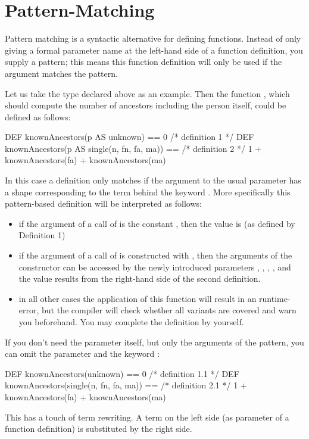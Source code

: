 \section{Pattern-Matching}
\label{sec:patternType}

\advanced 
Pattern matching is a syntactic alternative for defining functions.
Instead of only giving a formal parameter name at the left-hand side of a
function definition, 
you supply a pattern; this means this function definition will only
be used if the argument matches the pattern.

Let us take the  type   declared above as an example.
Then the
function , which should compute the
number of ancestors including the person itself, could be defined as
follows:
\begin{prog}
DEF knownAncestors(p AS unknown) == 0                /* definition 1 */
DEF knownAncestors(p AS single(n, fn, fa, ma)) ==    /* definition 2 */
              1 + knownAncestors(fa) + knownAncestors(ma)
\end{prog}
In this case a definition only matches if the argument to the usual
parameter  has 
a shape corresponding to the term behind the keyword .
More specifically this pattern-based definition will be interpreted as
follows: 
\begin{itemize}
\item if the argument of a call of  is the
  constant , then the value is  (as defined by
  Definition 1)
\item if the argument of a call of  is constructed
  with , then the arguments of the constructor can be
  accessed by the newly introduced parameters , ,
  , , and the value 
  results from the right-hand side of the second definition.
\item in all other cases the application of this function will result
  in an runtime-error, but the compiler will check whether all variants are
  covered and warn you beforehand. 
  You may complete the definition by yourself. 
\end{itemize}

If you don't need the parameter itself, but only the arguments of the
pattern, you can omit the parameter and the keyword :
\begin{prog}
DEF knownAncestors(unknown) == 0                /* definition 1.1 */
DEF knownAncestors(single(n, fn, fa, ma)) ==    /* definition 2.1 */
              1 + knownAncestors(fa) + knownAncestors(ma)
\end{prog}
This has a touch of term rewriting. A term on the left
side (as parameter of a function definition) is substituted by the
right side.
\medskip

